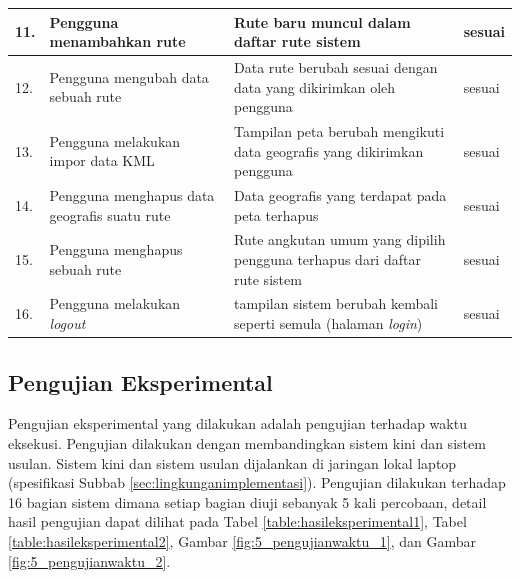 \begin{table}[htbp]
\begin{tabular}{|p{0.37cm}| p{3.5cm}| p{7cm}| p{2.5cm}|}
		11. & Pengguna menambahkan rute & Rute baru muncul dalam daftar rute sistem & sesuai \\ \hline
		12. & Pengguna mengubah data sebuah rute & Data rute berubah sesuai dengan data yang dikirimkan oleh pengguna & sesuai  \\ \hline
		13. & Pengguna melakukan impor data KML & Tampilan peta berubah mengikuti data geografis yang dikirimkan pengguna & sesuai \\ \hline
		14. & Pengguna menghapus data geografis suatu rute & Data geografis yang terdapat pada peta terhapus & sesuai \\ \hline
		15. & Pengguna menghapus sebuah rute & Rute angkutan umum yang dipilih pengguna terhapus dari daftar rute sistem & sesuai  \\ \hline
		16. & Pengguna melakukan \textit{logout} & tampilan sistem berubah kembali seperti semula (halaman \textit{login}) & sesuai  \\ \hline
		\end{tabular}
	\label{table:hasilfungsional}
\end{table}

\subsection{Pengujian Eksperimental}
\label{sec:pengujianeksperimental}
Pengujian eksperimental yang dilakukan adalah pengujian terhadap waktu eksekusi. Pengujian dilakukan dengan membandingkan sistem kini dan sistem usulan. Sistem kini dan sistem usulan dijalankan di jaringan lokal laptop (spesifikasi Subbab \ref{sec:lingkunganimplementasi}). Pengujian dilakukan terhadap 16 bagian sistem dimana setiap bagian diuji sebanyak 5 kali percobaan, detail hasil pengujian dapat dilihat pada Tabel \ref{table:hasileksperimental1}, Tabel \ref{table:hasileksperimental2}, Gambar \ref{fig:5_pengujianwaktu_1}, dan Gambar \ref{fig:5_pengujianwaktu_2}.


